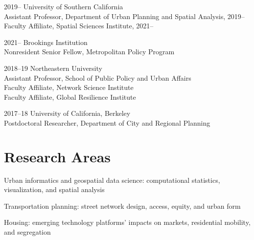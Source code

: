 \documentclass[12pt,letterpaper]{report}
\newcommand{\listitemspace}{0.25em}
\renewenvironment{itemize}
{\begin{list}{}{\setlength{\leftmargin}{0em}
                \setlength{\parskip}{0em}
                \setlength{\itemsep}{\listitemspace}
                \setlength{\parsep}{\listitemspace}}}
{\end{list}}
\begin{document}
    \begin{tablist}

        \item[2019--]   \tab{}University of Southern California \\
                              Assistant Professor, Department of Urban Planning and Spatial Analysis, 2019-- \\
                              Faculty Affiliate, Spatial Sciences Institute, 2021--

        \item[2021--]   \tab{}Brookings Institution \\
                              Nonresident Senior Fellow, Metropolitan Policy Program \\

        \item[2018--19] \tab{}Northeastern University \\
                              Assistant Professor, School of Public Policy and Urban Affairs \\
                              Faculty Affiliate, Network Science Institute \\
                              Faculty Affiliate, Global Resilience Institute

        \item[2017--18] \tab{}University of California, Berkeley \\
                              Postdoctoral Researcher, Department of City and Regional Planning

    \end{tablist}



    \section*{Research Areas}

    \begin{itemize}

        \item Urban informatics and geospatial data science: computational statistics, visualization, and spatial analysis
        \item Transportation planning: street network design, access, equity, and urban form
        \item Housing: emerging technology platforms' impacts on markets, residential mobility, and segregation

    \end{itemize}
\end{document}

